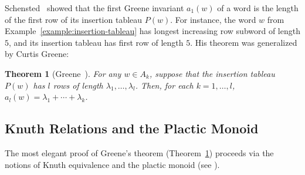 \documentclass[10pt]{amsproc}
\newtheorem{theorem}{Theorem}[subsection]
\theoremstyle{definition}
\theoremstyle{remark}
\begin{document}
Schensted~\cite{schensted} showed that the first Greene invariant $a_1(w)$ of a word is the length of the first row of its insertion tableau $P(w)$.
For instance, the word $w$ from Example~\ref{example:insertion-tableau} has longest increasing row subword of length $5$, and its insertion tableau has first row of length $5$.
His theorem was generalized by Curtis Greene:
\begin{theorem}
  [Greene~\cite{Greene-schen}]
  \label{theorem:Greene}
  For any $w\in A_k$, suppose that the insertion tableau $P(w)$ has $l$ rows of length $\lambda_1,\dotsc,\lambda_l$.
  Then, for each $k=1,\dotsc,l$, $a_l(w)=\lambda_1+\dotsb + \lambda_k$.
\end{theorem}
\subsection{Knuth Relations and the Plactic Monoid}
\label{sec:knuth-equivalence}
The most elegant proof of Greene's theorem (Theorem~\ref{theorem:Greene}) proceeds via the notions of Knuth equivalence and the plactic monoid (see \cite{Lascoux}).
\end{document}
